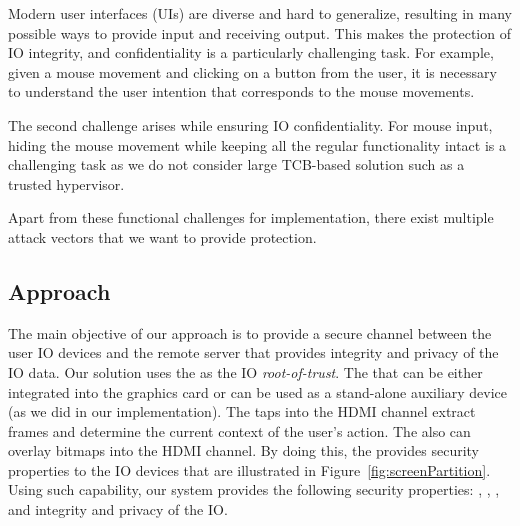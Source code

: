 Modern user interfaces (UIs) are diverse and hard to generalize, resulting in many possible ways to provide input and receiving output.  This makes the protection of IO integrity, and confidentiality is a particularly challenging task. For example, given a mouse movement and clicking on a button from the user, it is necessary to understand the user intention that corresponds to the mouse movements. 

The second challenge arises while ensuring IO confidentiality. For mouse input, hiding the mouse movement while keeping all the regular functionality intact is a challenging task as we do not consider large TCB-based solution such as a trusted hypervisor.


Apart from these functional challenges for implementation, there exist multiple attack vectors that we want to provide protection. 
\fi

\iffalse
\subsection{Approach}

The main objective of our approach is to provide a secure channel between the user IO devices and the remote server that provides integrity and privacy of the IO data. Our solution uses the \device as the IO \emph{root-of-trust}. The \device that can be either integrated into the graphics card or can be used as a stand-alone auxiliary device (as we did in our implementation). The \device taps into the HDMI channel extract frames and determine the current context of the user's action. The \device also can overlay bitmaps into the HDMI channel. By doing this, the \device provides security properties to the IO devices that are illustrated in Figure~\ref{fig:screenPartition}. Using such capability, our system provides the following security properties: \emph{\pop}, \emph{\poui}, \emph{\poa}, and integrity and privacy of the IO.

